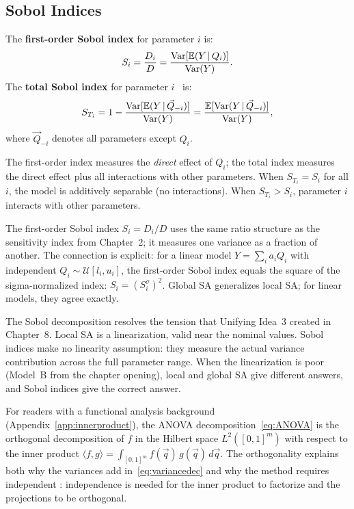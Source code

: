 \subsection{Sobol Indices}

\begin{definition}
The \textbf{first-order Sobol index} for parameter $i$ is:
\begin{equation}
  S_i = \frac{D_i}{D} = \frac{\operatorname{Var}[\mathbb{E}(Y\,|\,Q_i)]}{\operatorname{Var}(Y)}.
  \label{eq:S1}
\end{equation}
The \textbf{total Sobol index} for parameter $i$~\cite{homma1996importance} is:
\begin{equation}
  S_{T_i} = 1 - \frac{\operatorname{Var}[\mathbb{E}(Y\,|\,\vec{Q}_{-i})]}{\operatorname{Var}(Y)}
           = \frac{\mathbb{E}[\operatorname{Var}(Y\,|\,\vec{Q}_{-i})]}{\operatorname{Var}(Y)},
  \label{eq:ST}
\end{equation}
where $\vec{Q}_{-i}$ denotes all parameters except $Q_i$.
\end{definition}

The first-order index measures the \emph{direct} effect of $Q_i$;
the total index measures the direct effect plus all interactions with
other parameters. When $S_{T_i} = S_i$ for all $i$, the model is
additively separable (no interactions). When $S_{T_i} > S_i$,
parameter $i$ interacts with other parameters.

 The first-order Sobol index $S_i = D_i/D$ uses the
same ratio structure as the sensitivity index from Chapter~2;
it measures one variance as a fraction of another. The connection
is explicit: for a linear model $Y = \sum_i a_i Q_i$ with independent
$Q_i \sim \mathcal{U}[l_i, u_i]$, the first-order Sobol index equals
the square of the sigma-normalized index: $S_i = (S_i^\sigma)^2$.
Global SA generalizes local SA; for linear models, they agree exactly.

 The Sobol decomposition resolves the tension that
Unifying Idea~3 created in Chapter~8. Local SA is a linearization,
valid near the nominal values. Sobol indices make no linearity
assumption: they measure the actual variance contribution across
the full parameter range. When the linearization is poor (Model~B
from the chapter opening), local and global SA give different answers,
and Sobol indices give the correct answer.

For readers with a functional analysis background (Appendix~\ref{app:innerproduct}), the ANOVA decomposition~\eqref{eq:ANOVA}
is the orthogonal decomposition of $f$ in the Hilbert space
$L^2([0,1]^m)$ with respect to the inner product
$\langle f, g\rangle = \int_{[0,1]^m} f(\vec{q})\,g(\vec{q})\,d\vec{q}$.
The orthogonality explains both why the variances add
in~\eqref{eq:variancedec} and why the method requires independent \POIs:
independence is needed for the inner product to factorize and the
projections to be orthogonal.

